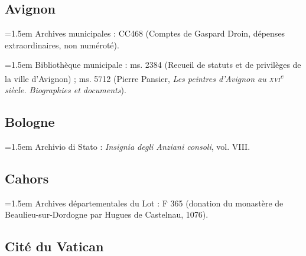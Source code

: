 \documentclass[12pt,twoside,openany]{book}
\newenvironment{PurhBibliography}
  {%
    \par
    \setlength{\parindent}{0pt}%
    \setlength{\leftskip}{0pt}%
  }
  {%
    \par
  }
\begin{document}
\subsection{Avignon}

\begin{PurhBibliography}
\noindent\hangindent=1.5em Archives municipales : \textsc{CC468} (Comptes de Gaspard Droin, dépenses extraordinaires, non numéroté).\par
\noindent\hangindent=1.5em Bibliothèque municipale : ms. 2384 (Recueil de statuts et de privilèges de la ville d’Avignon) ; ms. 5712 (Pierre Pansier, \textit{Les peintres d’Avignon au }\textit{\textsc{xvi}}\textit{\textsuperscript{e}}\textit{ siècle. Biographies et documents}).\par
\end{PurhBibliography}

\subsection{Bologne}

\begin{PurhBibliography}
\noindent\hangindent=1.5em Archivio di Stato : \textit{Insignia degli Anziani consoli}, vol. \textsc{VIII}.\par
\end{PurhBibliography}

\subsection{Cahors}

\begin{PurhBibliography}
\noindent\hangindent=1.5em Archives départementales du Lot : F 365 (donation du monastère de Beaulieu-sur-Dordogne par Hugues de Castelnau, 1076).\par
\end{PurhBibliography}

\subsection{Cité du Vatican}
\end{document}
